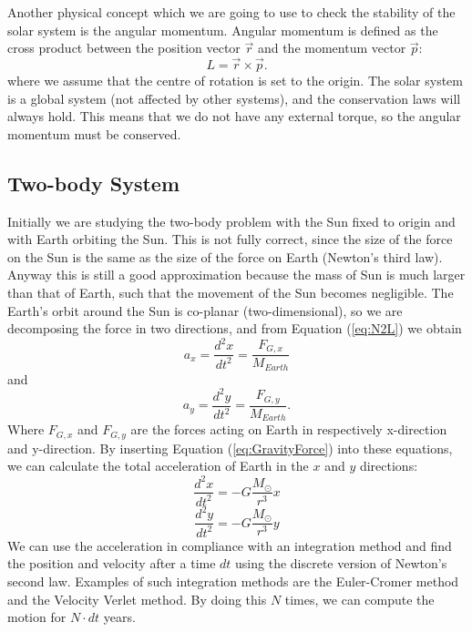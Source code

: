 \documentclass[norsk,a4paper,12pt]{article}
\begin{document}
Another physical concept which we are going to use to check the stability of the solar system is the angular momentum. Angular momentum is defined as the cross product between the position vector $\vec{r}$ and the momentum vector $\vec{p}$:
\begin{equation}
L=\vec{r}\times\vec{p}.
\end{equation}
where we assume that the centre of rotation is set to the origin. The solar system is a global system (not affected by other systems), and the conservation laws will always hold. This means that we do not have any external torque, so the angular momentum must be conserved. 
\subsection{Two-body System}
Initially we are studying the two-body problem with the Sun fixed to origin and with Earth orbiting the Sun. This is not fully correct, since the size of the force on the Sun is the same as the size of the force on Earth (Newton's third law). Anyway this is still a good approximation because the mass of Sun is much larger than that of Earth, such that the movement of the Sun becomes negligible. The Earth's orbit around the Sun is co-planar (two-dimensional), so we are decomposing the force in two directions, and from Equation (\ref{eq:N2L}) we obtain
\begin{equation}
a_x=\frac{d^2x}{dt^2}=\frac{F_{G,x}}{M_{Earth}}
\end{equation}
and
\begin{equation}
a_y=\frac{d^2y}{dt^2}=\frac{F_{G,y}}{M_{Earth}}.
\end{equation}
Where $F_{G,x}$ and $F_{G,y}$ are the forces acting on Earth in respectively x-direction and y-direction. By inserting Equation (\ref{eq:GravityForce}) into these equations, we can calculate the total acceleration of Earth in the $x$ and $y$ directions:
\begin{equation}
\frac{d^2x}{dt^2}=-G\frac{M_\odot}{r^3}x
\end{equation}
\begin{equation}
\frac{d^2y}{dt^2}=-G\frac{M_\odot}{r^3}y
\end{equation}
We can use the acceleration in compliance with an integration method and find the position and velocity after a time $dt$ using the discrete version of Newton's second law. Examples of such integration methods are the Euler-Cromer method and the Velocity Verlet method. By doing this $N$ times, we can compute the motion for $N\cdot dt$ years. 
\end{document}
